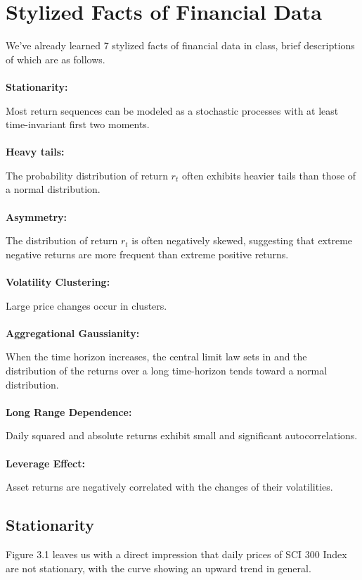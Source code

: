 \documentclass[paper=a4, fontsize=11pt]{scrartcl} %
\numberwithin{equation}{section} %
\numberwithin{figure}{section} %
\numberwithin{table}{section} %
\begin{document}
\section{Stylized Facts of Financial Data}
 We've already learned 7 stylized facts of financial data in class, brief descriptions of which are as follows.\\
 \\
\textbf{\large{Stationarity:}}\par
 Most return sequences can be modeled as a stochastic processes with at least time-invariant first two
moments.\\
\\
\textbf{\large{Heavy tails:}}\par
 The probability distribution of return $r_{t}$ often exhibits heavier tails than those of a normal distribution.\\
\\
\textbf{\large{Asymmetry:}}\par
 The distribution of return $r_{t}$ is often negatively skewed, suggesting that extreme negative returns are more frequent than extreme positive returns.\\
\\
\textbf{\large{Volatility Clustering:}}\par
 Large price changes occur in clusters.\\
\\
\textbf{\large{Aggregational Gaussianity:}}\par
 When the time horizon increases, the central limit law sets in and the distribution of the returns over a
long time-horizon tends toward a normal distribution.\\
\\
\textbf{\large{Long Range Dependence:}}\par
 Daily squared and absolute returns exhibit small and significant autocorrelations.\\
\\
\textbf{\large{Leverage Effect:}}\par
 Asset returns are negatively correlated with the changes of their volatilities.\\

\bigskip
\bigskip
\bigskip
\bigskip
\subsection{Stationarity}
Figure 3.1 leaves us with a direct impression that daily prices of SCI 300 Index are not stationary, with the curve showing an upward trend in general.
\end{document}
